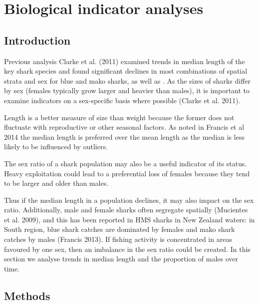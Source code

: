 \documentclass[12pt]{SCreport}
\begin{document}
      
      
      
     
      
\section{Biological indicator analyses}
      \subsection{Introduction}
Previous analysis Clarke et al. (2011) examined trends in median length of the key shark species  and 
found significant declines in most combinations of spatial strata and sex for blue and mako sharks, as well as .
As the sizes of sharks differ by sex (females typically grow larger and heavier than males), it is important
to examine indicators on a sex-specific basis where possible (Clarke et al. 2011). 

Length is a better measure of size than weight because the former does not fluctuate with reproductive or other seasonal
factors. As noted in Francis et al 2014 the median length is preferred over the mean length as the median is less likely to be
influenced by outliers. 

The sex ratio of a shark population may also be a useful indicator of its status. Heavy exploitation
could lead to a preferential loss of females because they tend to be larger and older than males.

Thus if the median length in a population declines, it may also impact on the sex ratio. Additionally, male
and female sharks often segregate spatially (Mucientes et al. 2009), and this has been reported in
HMS sharks in New Zealand waters: in South region, blue shark catches are dominated by females
and mako shark catches by males (Francis 2013). If fishing activity is concentrated in areas favoured
by one sex, then an imbalance in the sex ratio could be created.
In this section we analyse trends in median length and the proportion of males over time.  
      
      \subsection{Methods}
\end{document}
